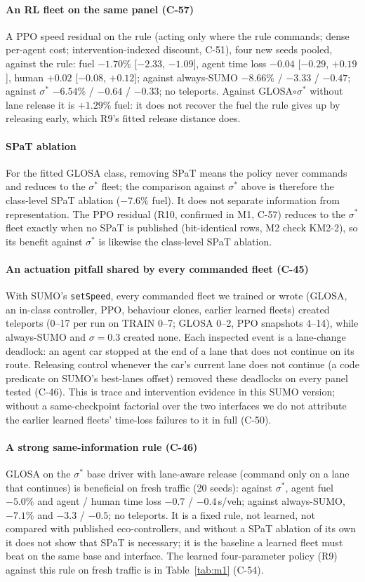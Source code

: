 \paragraph{An RL fleet on the same panel (C-57)} A PPO speed residual on the rule (acting only where the rule commands; dense per-agent
cost; intervention-indexed discount, C-51), four new seeds pooled, against the rule: fuel $-1.70\%$ [$-2.33$, $-1.09$], agent time loss
$-0.04$ [$-0.29$, $+0.19$], human $+0.02$ [$-0.08$, $+0.12$]; against always-SUMO $-8.66\%$ / $-3.33$ / $-0.47$; against $\sigma^*$
$-6.54\%$ / $-0.64$ / $-0.33$; no teleports. Against GLOSA$\circ\sigma^*$ without lane release it is $+1.29\%$ fuel: it does not recover the fuel the
rule gives up by releasing early, which R9's fitted release distance does.
\paragraph{SPaT ablation} For the fitted GLOSA class, removing SPaT means the policy never commands and reduces to the
$\sigma^*$ fleet; the comparison against $\sigma^*$ above is therefore the class-level SPaT ablation ($-7.6\%$ fuel). It does not separate
information from representation. The PPO residual (R10, confirmed in M1, C-57) reduces to the $\sigma^*$ fleet exactly when no SPaT is
published (bit-identical rows, M2 check KM2-2), so its benefit against $\sigma^*$ is likewise the class-level SPaT ablation.
\paragraph{An actuation pitfall shared by every commanded fleet (C-45)} With SUMO's \texttt{setSpeed}, every commanded fleet we
trained or wrote (GLOSA, an in-class controller, PPO, behaviour clones, earlier learned fleets) created teleports (0--17 per run on TRAIN 0--7;
GLOSA 0--2, PPO snapshots 4--14), while always-SUMO and $\sigma=0.3$ created none. Each inspected event is a lane-change deadlock: an agent car stopped at the end of a lane that does
not continue on its route. Releasing control whenever the car's current lane does not continue (a code predicate on SUMO's best-lanes
offset) removed these deadlocks on every panel tested (C-46). This is trace and intervention evidence in this SUMO version; without a
same-checkpoint factorial over the two interfaces we do not attribute the earlier learned fleets' time-loss failures to it in full (C-50).
\paragraph{A strong same-information rule (C-46)} GLOSA on the $\sigma^*$ base driver with lane-aware release (command only on a lane
that continues) is beneficial on fresh traffic (20 seeds): against $\sigma^*$, agent fuel $-5.0\%$ and agent / human time loss $-0.7$ /
$-0.4$\,s/veh; against always-SUMO, $-7.1\%$ and $-3.3$ / $-0.5$; no teleports. It is a fixed rule, not learned, not compared with
published eco-controllers, and without a SPaT ablation of its own it does not show that SPaT is necessary; it is the baseline a learned
fleet must beat on the same base and interface.
The learned four-parameter policy (R9) against this rule on fresh traffic is in Table~\ref{tab:m1} (C-54).

